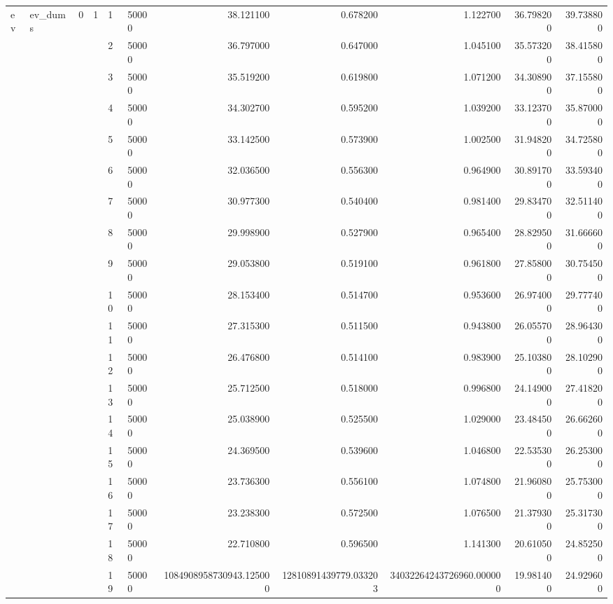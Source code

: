 \begin{tabular}{llllllrrrrr}
\multirow[t]{202}{*}{ev} & \multirow[t]{202}{*}{ev_dums} & \multirow[t]{101}{*}{0} & \multirow[t]{25}{*}{1} & 1 & 50000 & 38.121100 & 0.678200 & 1.122700 & 36.798200 & 39.738800 \\
\cline{5-11}
 &  &  &  & 2 & 50000 & 36.797000 & 0.647000 & 1.045100 & 35.573200 & 38.415800 \\
\cline{5-11}
 &  &  &  & 3 & 50000 & 35.519200 & 0.619800 & 1.071200 & 34.308900 & 37.155800 \\
\cline{5-11}
 &  &  &  & 4 & 50000 & 34.302700 & 0.595200 & 1.039200 & 33.123700 & 35.870000 \\
\cline{5-11}
 &  &  &  & 5 & 50000 & 33.142500 & 0.573900 & 1.002500 & 31.948200 & 34.725800 \\
\cline{5-11}
 &  &  &  & 6 & 50000 & 32.036500 & 0.556300 & 0.964900 & 30.891700 & 33.593400 \\
\cline{5-11}
 &  &  &  & 7 & 50000 & 30.977300 & 0.540400 & 0.981400 & 29.834700 & 32.511400 \\
\cline{5-11}
 &  &  &  & 8 & 50000 & 29.998900 & 0.527900 & 0.965400 & 28.829500 & 31.666600 \\
\cline{5-11}
 &  &  &  & 9 & 50000 & 29.053800 & 0.519100 & 0.961800 & 27.858000 & 30.754500 \\
\cline{5-11}
 &  &  &  & 10 & 50000 & 28.153400 & 0.514700 & 0.953600 & 26.974000 & 29.777400 \\
\cline{5-11}
 &  &  &  & 11 & 50000 & 27.315300 & 0.511500 & 0.943800 & 26.055700 & 28.964300 \\
\cline{5-11}
 &  &  &  & 12 & 50000 & 26.476800 & 0.514100 & 0.983900 & 25.103800 & 28.102900 \\
\cline{5-11}
 &  &  &  & 13 & 50000 & 25.712500 & 0.518000 & 0.996800 & 24.149000 & 27.418200 \\
\cline{5-11}
 &  &  &  & 14 & 50000 & 25.038900 & 0.525500 & 1.029000 & 23.484500 & 26.662600 \\
\cline{5-11}
 &  &  &  & 15 & 50000 & 24.369500 & 0.539600 & 1.046800 & 22.535300 & 26.253000 \\
\cline{5-11}
 &  &  &  & 16 & 50000 & 23.736300 & 0.556100 & 1.074800 & 21.960800 & 25.753000 \\
\cline{5-11}
 &  &  &  & 17 & 50000 & 23.238300 & 0.572500 & 1.076500 & 21.379300 & 25.317300 \\
\cline{5-11}
 &  &  &  & 18 & 50000 & 22.710800 & 0.596500 & 1.141300 & 20.610500 & 24.852500 \\
\cline{5-11}
 &  &  &  & 19 & 50000 & 1084908958730943.125000 & 12810891439779.033203 & 34032264243726960.000000 & 19.981400 & 24.929600 \\

\end{tabular}
